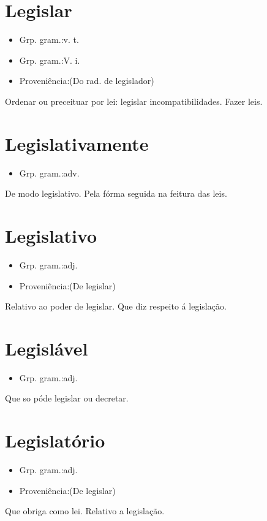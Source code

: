 \section{Legislar}
\begin{itemize}
\item {Grp. gram.:v. t.}
\end{itemize}
\begin{itemize}
\item {Grp. gram.:V. i.}
\end{itemize}
\begin{itemize}
\item {Proveniência:(Do rad. de \textunderscore legislador\textunderscore )}
\end{itemize}
Ordenar ou preceituar por lei: \textunderscore legislar incompatibilidades\textunderscore .
Fazer leis.
\section{Legislativamente}
\begin{itemize}
\item {Grp. gram.:adv.}
\end{itemize}
De modo legislativo.
Pela fórma seguida na feitura das leis.
\section{Legislativo}
\begin{itemize}
\item {Grp. gram.:adj.}
\end{itemize}
\begin{itemize}
\item {Proveniência:(De \textunderscore legislar\textunderscore )}
\end{itemize}
Relativo ao poder de legislar.
Que diz respeito á legislação.
\section{Legislável}
\begin{itemize}
\item {Grp. gram.:adj.}
\end{itemize}
Que so póde legislar ou decretar.
\section{Legislatório}
\begin{itemize}
\item {Grp. gram.:adj.}
\end{itemize}
\begin{itemize}
\item {Proveniência:(De \textunderscore legislar\textunderscore )}
\end{itemize}
Que obriga como lei.
Relativo a legislação.
